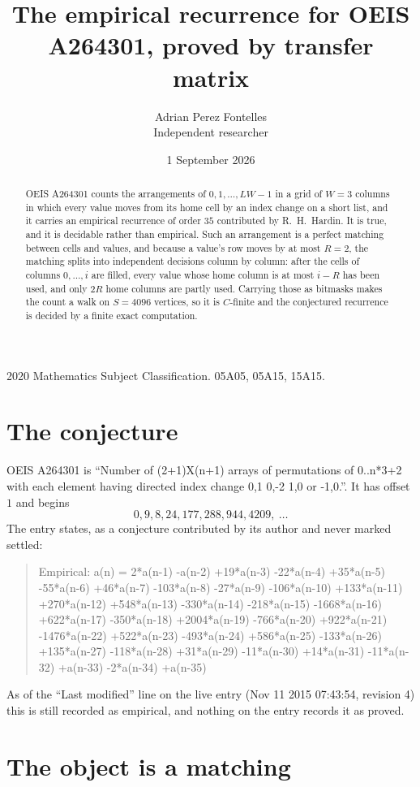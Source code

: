 \documentclass[11pt,a4paper]{article}
\title{The empirical recurrence for OEIS A264301, proved by transfer matrix}
\author{Adrian Perez Fontelles\\ \small Independent researcher}
\date{1 September 2026}
\theoremstyle{plain}
\theoremstyle{definition}
\begin{document}
\maketitle

\begin{abstract}
OEIS A264301 counts the arrangements of $0,1,\dots,LW-1$ in a grid of $W=3$ columns in which
every value moves from its home cell by an index change on a short list, and it carries an
empirical recurrence of order $35$ contributed by R.~H.~Hardin. It is true, and it is
decidable rather than empirical. Such an arrangement is a perfect matching between cells and
values, and because a value's row moves by at most $R=2$, the matching splits into
independent decisions column by column: after the cells of columns $0,\dots,i$ are filled,
every value whose home column is at most $i-R$ has been used, and only $2R$ home columns are
partly used. Carrying those as bitmasks makes the count a walk on $S=4096$ vertices, so it is
$C$-finite and the conjectured recurrence is decided by a finite exact computation.
\end{abstract}

\noindent\small 2020 Mathematics Subject Classification. 05A05, 05A15, 15A15.\normalsize

\section{The conjecture}

OEIS A264301 is ``Number of (2+1)X(n+1) arrays of permutations of 0..n*3+2 with each element having directed index change 0,1 0,-2 1,0 or -1,0.''. It has offset $1$ and begins
\[
0, 9, 8, 24, 177, 288, 944, 4209,\ \dots
\]
The entry states, as a conjecture contributed by its author and never marked settled:
\begin{quote}
Empirical: a(n) = 2*a(n-1) -a(n-2) +19*a(n-3) -22*a(n-4) +35*a(n-5) -55*a(n-6) +46*a(n-7) -103*a(n-8) -27*a(n-9) -106*a(n-10) +133*a(n-11) +270*a(n-12) +548*a(n-13) -330*a(n-14) -218*a(n-15) -1668*a(n-16) +622*a(n-17) -350*a(n-18) +2004*a(n-19) -766*a(n-20) +922*a(n-21) -1476*a(n-22) +522*a(n-23) -493*a(n-24) +586*a(n-25) -133*a(n-26) +135*a(n-27) -118*a(n-28) +31*a(n-29) -11*a(n-30) +14*a(n-31) -11*a(n-32) +a(n-33) -2*a(n-34) +a(n-35)
\end{quote}
As of the ``Last modified'' line on the live entry (Nov 11 2015 07:43:54, revision 4) this is still
recorded as empirical, and nothing on the entry records it as proved.

\section{The object is a matching}
\end{document}
